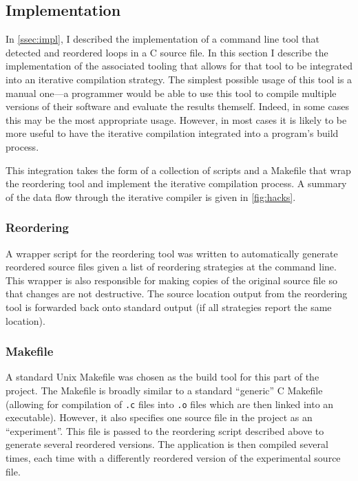 \documentclass[journal]{IEEEtran}
\begin{document}
\subsection{Implementation}

In \autoref{ssec:impl}, I described the implementation of a command line tool
that detected and reordered loops in a C source file. In this section I describe
the implementation of the associated tooling that allows for that tool to be
integrated into an iterative compilation strategy. The simplest possible usage
of this tool is a manual one---a programmer would be able to use this tool to
compile multiple versions of their software and evaluate the results themself.
Indeed, in some cases this may be the most appropriate usage. However, in most
cases it is likely to be more useful to have the iterative compilation
integrated into a program's build process.

This integration takes the form of a collection of scripts and a Makefile that
wrap the reordering tool and implement the iterative compilation process. A
summary of the data flow through the iterative compiler is given in
\autoref{fig:hacks}.

\subsubsection{Reordering}

A wrapper script for the reordering tool was written to automatically generate
reordered source files given a list of reordering strategies at the command
line. This wrapper is also responsible for making copies of the original source
file so that changes are not destructive. The source location output from the
reordering tool is forwarded back onto standard output (if all strategies report
the same location).

\subsubsection{Makefile}

A standard Unix Makefile was chosen as the build tool for this part of the
project. The Makefile is broadly similar to a standard ``generic'' C Makefile
(allowing for compilation of \texttt{.c} files into \texttt{.o} files which are
then linked into an executable). However, it also specifies one source file in
the project as an ``experiment''. This file is passed to the reordering script
described above to generate several reordered versions. The application is then
compiled several times, each time with a differently reordered version of the
experimental source file.
\end{document}
